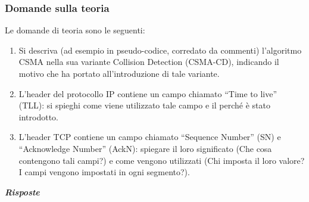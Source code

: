 \documentclass[a4paper]{article}
\newcommand{\dquotes}[1]{``#1''}
\begin{document}
	\subsubsection{Domande sulla teoria}
	Le domande di teoria sono le seguenti:
	\begin{enumerate}
		\item Si descriva (ad esempio in pseudo-codice, corredato da commenti) l'algoritmo CSMA nella sua variante Collision Detection (CSMA-CD), indicando il motivo che ha portato all'introduzione di tale variante.
		
		\item L'header del protocollo IP contiene un campo chiamato \dquotes{Time to live} (TLL): si spieghi come viene utilizzato tale campo e il perché è stato introdotto.
		
		\item L'header TCP contiene un campo chiamato \dquotes{Sequence Number} (SN) e \dquotes{Acknowledge Number} (AckN): spiegare il loro significato (Che cosa contengono tali campi?) e come vengono utilizzati (Chi imposta il loro valore? I campi vengono impostati in ogni segmento?).\label{TCP SN e AckN}
	\end{enumerate}
	\textcolor{Green4}{\textbf{\emph{Risposte}}}
\end{document}
